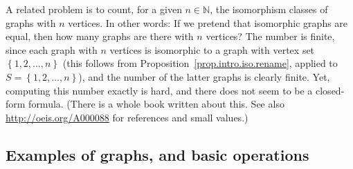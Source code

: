 \documentclass[numbers=enddot,12pt,final,onecolumn,notitlepage]{scrartcl}%
\theoremstyle{definition}
\newcommand{\NN}{\mathbb{N}}
\newcommand{\set}[1]{\left\{ #1 \right\}}
\begin{document}
A related problem is to count, for a given $n \in \NN$,
the isomorphism classes of graphs with $n$ vertices. In other words:
If we pretend that isomorphic graphs are equal, then how many graphs
are there with $n$ vertices? The number is finite, since each graph
with $n$ vertices is isomorphic to a graph with vertex set
$\set{1,2,\ldots, n}$ (this follows from
Proposition~\ref{prop.intro.iso.rename}, applied to
$S = \set{1,2,\ldots, n}$), and the number of the latter graphs is
clearly finite. Yet, computing this number exactly is hard, and there
does not seem to be a closed-form formula. (There is a whole book
\cite{HarPal73} written about this. See also
\url{http://oeis.org/A000088} for references and small values.)

\subsection{\label{sect.intro.paths}Examples of graphs, and basic
operations}
\end{document}
